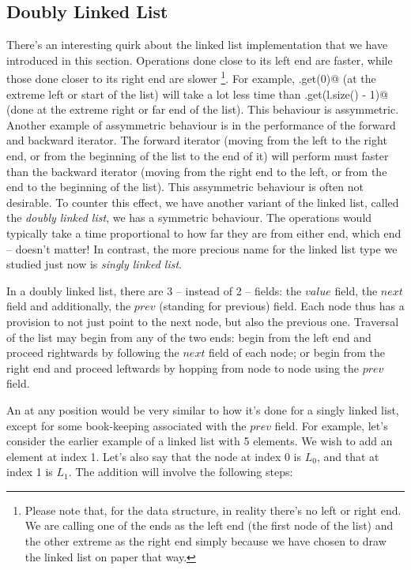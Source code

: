 \documentclass[12pt,a4paper]{article}
\begin{document}
\subsection{Doubly Linked List}
There's an interesting quirk about the linked list implementation that we have introduced in this section. Operations done close to its left end are faster, while those done closer to its right end are slower \footnote{Please note that, for the data structure, in reality there's no left or right end. We are calling one of the ends as the left end (the first node of the list) and the other extreme as the right end simply because we have chosen to draw the linked list on paper that way.}. For example, \lstinline@l.get(0)@ (\lstinline@get@ at the extreme left or start of the list) will take a lot less time than \lstinline@l.get(l.size() - 1)@ (\lstinline@get@ done at the extreme right or far end of the list). This behaviour is assymmetric. Another example of assymmetric behaviour is in the performance of the forward and backward iterator. The forward iterator (moving from the left to the right end, or from the beginning of the list to the end of it) will perform must faster than the backward iterator (moving from the right end to the left, or from the end to the beginning of the list). This assymmetric behaviour is often not desirable. To counter this effect, we have another variant of the linked list, called the \emph{doubly linked list}, we has a symmetric behaviour. The operations would typically take a time proportional to how far they are from either end, which end -- doesn't matter! In contrast, the more precious name for the linked list type we studied just now is \emph{singly linked list}.

In a doubly linked list, there are 3 -- instead of 2 -- fields: the $value$ field, the $next$ field and additionally, the $prev$ (standing for previous) field. Each node thus has a provision to not just point to the next node, but also the previous one. Traversal of the list may begin from any of the two ends: begin from the left end and proceed rightwards by following the $next$ field of each node; or begin from the right end and proceed leftwards by hopping from node to node using the $prev$ field.

An \lstinline@add@ at any position would be very similar to how it's done for a singly linked list, except for some book-keeping associated with the $prev$ field. For example, let's consider the earlier example of a linked list with 5 elements. We wish to add an element at index 1. Let's also say that the node at index 0 is $L_0$, and that at index 1 is $L_1$. The addition will involve the following steps:
\end{document}

